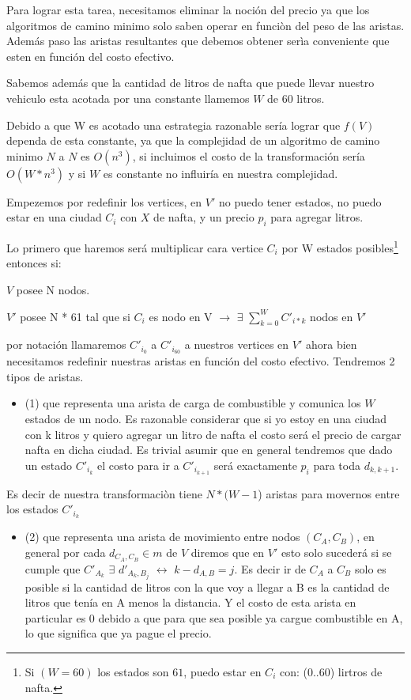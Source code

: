 \documentclass[12pt]{article}
\begin{document}
Para lograr esta tarea, necesitamos eliminar la noción del precio ya que los algoritmos de camino minimo solo saben operar en funciòn del peso de las aristas. Además paso las aristas resultantes que debemos obtener serìa conveniente que esten en función del costo efectivo.

Sabemos además que la cantidad de litros de nafta que puede llevar nuestro vehiculo esta acotada por una constante llamemos $W$ de 60 litros. 

Debido a que W es acotado una estrategia razonable sería lograr que $f(V)$ dependa de esta constante, ya que la complejidad de un algoritmo de camino minimo $N$ a $N$ es $O(n^3)$, si incluimos el costo de la transformación sería $O(W * n^3)$ y si $W$ es constante no influiría en nuestra complejidad.

Empezemos por redefinir los vertices, en $V'$ no puedo tener estados, no puedo estar en una ciudad $C_i$ con $X$ de nafta, y un precio $p_i$ para agregar litros.

Lo primero que haremos será multiplicar cara vertice $C_i$ por W estados posibles\footnote{Si $(W = 60)$ los estados son $61$, puedo estar en $C_i$ con: (0..60) lirtros de nafta.} entonces si:

$V$ posee  N nodos. 

$V'$ posee N * 61 tal que si $C_i$ es nodo en V $\rightarrow$ $\exists$ $\sum_{k=0}^{W} C'_{i * k}$ nodos en $V'$

por notación llamaremos $C'_{i_0}$ a $C'_{i_{60}}$ a nuestros vertices en $V'$ ahora bien necesitamos redefinir nuestras aristas en función del costo efectivo. Tendremos 2 tipos de aristas.

\begin{itemize}
	\item (1) que representa una arista de carga de combustible y comunica los $W$ estados de un nodo. Es razonable considerar que si yo estoy en una ciudad con k litros y quiero agregar un litro de nafta el costo será el precio de cargar nafta en dicha ciudad. Es trivial asumir que en general tendremos que dado un estado $C'_{i_k}$ el costo para ir a $C'_{i_{k+1}}$ será exactamente $p_i$ para toda $d_{k,k+1}$.
\end{itemize}

Es decir de nuestra transformaciòn tiene  $N * (W - 1$) aristas para movernos entre los estados $C'_{i_k}$

\begin{itemize}
	\item (2) que representa una arista de movimiento entre nodos $(C_A, C_B)$, en general por cada $d_{C_A,C_B} \in m$ de $V$ diremos que en $V'$ esto solo sucederá si se cumple que $C'_{A_k}$ $\exists$ $d'_{A_k,B_j}$ $\leftrightarrow$  $k - d_{A,B} = j$. Es decir ir de $C_A$ a $C_B$ solo es posible si la cantidad de litros con la que voy a llegar a B es la cantidad de litros que tenía en A menos la distancia. Y el costo de esta arista en particular es $0$ debido a que para que sea posible ya cargue combustible en A, lo que significa que ya pague el precio.
\end{itemize}
\end{document}
